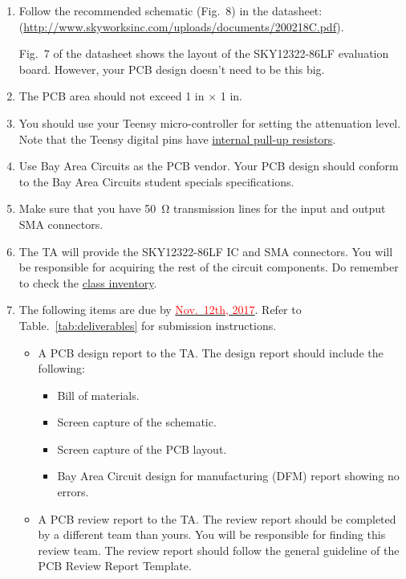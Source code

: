 \documentclass[letterpaper, 11pt]{article}
\newcommand{\due}[1]{\href{https://github.com/ucdart/UCD-EEC134/blob/master/support/schedule/eec134-schedule.pdf}{\textcolor{red}{#1}}}
\begin{document}
\begin{enumerate}
	\item Follow the recommended schematic (Fig.~8) in the datasheet:\\ (\url{http://www.skyworksinc.com/uploads/documents/200218C.pdf}). 
	
	Fig.~7 of the datasheet shows the layout of the SKY12322-86LF evaluation board. However, your PCB design doesn't need to be this big.

	\item The PCB area should not exceed 1 in $\times$ 1 in.	

	\item You should use your Teensy micro-controller for setting the attenuation level. Note that the Teensy digital pins have \href{https://www.pjrc.com/teensy/td_digital.html}{internal pull-up resistors}. 
	
	\item Use Bay Area Circuits as the PCB vendor. Your PCB design should conform to the Bay Area Circuits student specials specifications. 
	
	\item Make sure that you have \SI{50}{\ohm} transmission lines for the input and output SMA connectors.
	
	\item The TA will provide the SKY12322-86LF IC and SMA connectors. You will be responsible for acquiring the rest of the circuit components. Do remember to check the \href{https://docs.google.com/spreadsheets/d/1GJnBLUymuVzXjrK0Zkdbc2lwTbw0z9a0JR4bLLzO-Sw/edit#gid=4}{class inventory}. 
	
	\item The following items are due by \due{Nov.~12th, 2017}. Refer to Table.~\ref{tab:deliverables} for submission instructions. 
		\begin{itemize}
			\item A PCB design report to the TA. The design report should include the following:
				\begin{itemize}
					\item Bill of materials.
					\item Screen capture of the schematic.
					\item Screen capture of the PCB layout.
					\item Bay Area Circuit design for manufacturing (DFM) report showing no errors.
				\end{itemize}
			\item A PCB review report to the TA. The review report should be completed by a different team than yours. You will be responsible for finding this review team. The review report should follow the general guideline of the PCB Review Report Template.
			

\end{itemize}
\end{enumerate}
\end{document}
